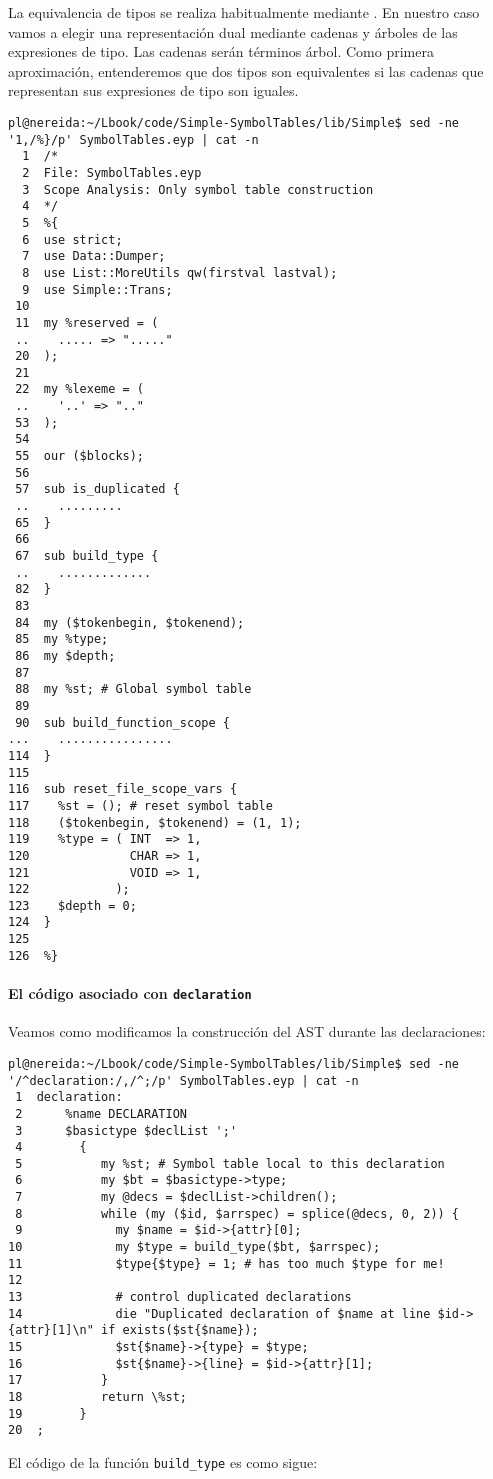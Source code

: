 La equivalencia de tipos se realiza habitualmente mediante 
. En nuestro caso vamos a
elegir una representación dual mediante cadenas y árboles 
de las expresiones de tipo. Las cadenas serán términos
árbol. Como primera aproximación, entenderemos
que dos tipos son equivalentes si las cadenas que representan
sus expresiones de tipo son iguales. 

\begin{verbatim}
pl@nereida:~/Lbook/code/Simple-SymbolTables/lib/Simple$ sed -ne '1,/%}/p' SymbolTables.eyp | cat -n
  1  /*
  2  File: SymbolTables.eyp
  3  Scope Analysis: Only symbol table construction
  4  */
  5  %{
  6  use strict;
  7  use Data::Dumper;
  8  use List::MoreUtils qw(firstval lastval);
  9  use Simple::Trans;
 10
 11  my %reserved = (
 ..    ..... => "....."
 20  );
 21
 22  my %lexeme = (
 ..    '..' => ".."
 53  );
 54
 55  our ($blocks);
 56
 57  sub is_duplicated {
 ..    .........
 65  }
 66
 67  sub build_type {
 ..    .............
 82  }
 83
 84  my ($tokenbegin, $tokenend);
 85  my %type;
 86  my $depth;
 87
 88  my %st; # Global symbol table
 89
 90  sub build_function_scope {
...    ................
114  }
115
116  sub reset_file_scope_vars {
117    %st = (); # reset symbol table
118    ($tokenbegin, $tokenend) = (1, 1);
119    %type = ( INT  => 1,
120              CHAR => 1,
121              VOID => 1,
122            );
123    $depth = 0;
124  }
125
126  %}
\end{verbatim}

\paragraph{El código asociado con {\tt declaration}}
Veamos como modificamos la construcción del AST durante las declaraciones:

\begin{verbatim}
pl@nereida:~/Lbook/code/Simple-SymbolTables/lib/Simple$ sed -ne '/^declaration:/,/^;/p' SymbolTables.eyp | cat -n
 1  declaration:
 2      %name DECLARATION
 3      $basictype $declList ';'
 4        {
 5           my %st; # Symbol table local to this declaration
 6           my $bt = $basictype->type;
 7           my @decs = $declList->children();
 8           while (my ($id, $arrspec) = splice(@decs, 0, 2)) {
 9             my $name = $id->{attr}[0];
10             my $type = build_type($bt, $arrspec);
11             $type{$type} = 1; # has too much $type for me!
12
13             # control duplicated declarations
14             die "Duplicated declaration of $name at line $id->{attr}[1]\n" if exists($st{$name});
15             $st{$name}->{type} = $type;
16             $st{$name}->{line} = $id->{attr}[1];
17           }
18           return \%st;
19        }
20  ;
\end{verbatim}
El código de la función \verb|build_type| es como sigue:

